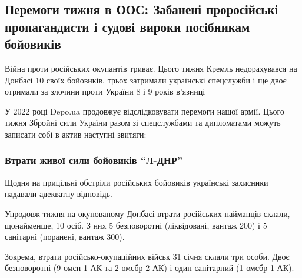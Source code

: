  
 
 
 
 
 
\subsection{Перемоги тижня в ООС: Забанені проросійські пропагандисти і судові вироки посібникам бойовиків}
\label{sec:06_02_2022.stz.news.ua.depo.1.peremogi_tyzhnja}
 

\begin{zznagolos}
Війна проти російських окупантів триває. Цього тижня Кремль недорахувався на
Донбасі 10 своїх бойовиків, трьох затримали українські спецслужби і ще двоє
отримали за злочини проти України 8 і 9 років в'язниці
\end{zznagolos}

У 2022 році Depo.ua продовжує відслідковувати перемоги нашої армії. Цього тижня
Збройні сили України разом зі спецслужбами та дипломатами можуть записати собі
в актив наступні звитяги:

\subsubsection{Втрати живої сили бойовиків \enquote{Л-ДНР}}

Щодня на прицільні обстріли російських бойовиків українські захисники надавали
адекватну відповідь.

Упродовж тижня на окупованому Донбасі втрати російських найманців склали,
щонайменше, 10 осіб. З них 5 безповоротні (ліквідовані, вантаж 200) і 5
санітарні (поранені, вантаж 300).

Зокрема, втрати російсько-окупаційних військ 31 січня склали три особи. Двоє
безповоротні (9 омсп 1 АК та 2 омсбр 2 АК) і один санітарний (1 омсбр 1 АК).

